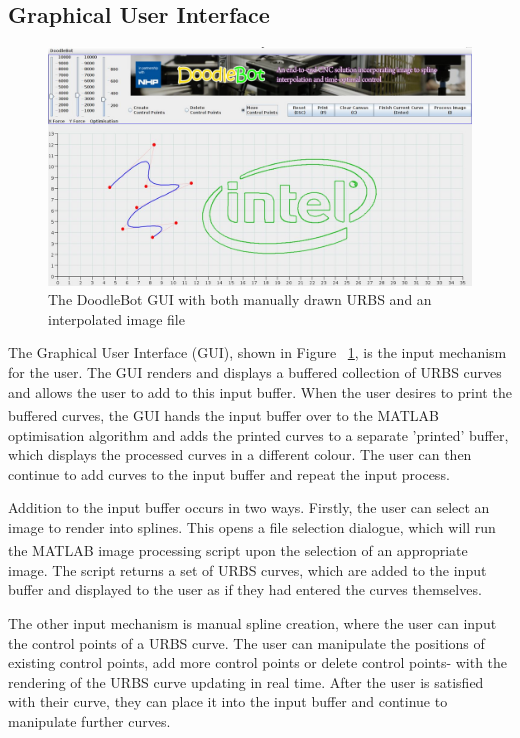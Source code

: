 \subsection{Graphical User Interface}

\begin{figure}[h]
	\centering
	\includegraphics[width=\textwidth]{figures/implementation/interface.jpg}
	\caption[The DoodleBot GUI]{The DoodleBot GUI with both manually drawn URBS and an interpolated image file}
	\label{fig:guiscreen}
\end{figure}

The Graphical User Interface (GUI), shown in Figure ~\ref{fig:guiscreen}, is the input mechanism for the user. The GUI renders and displays a buffered collection of URBS curves and allows the user to add to this input buffer. When the user desires to print the buffered curves, the GUI hands the input buffer over to the MATLAB\textsuperscript{\textregistered} optimisation algorithm and adds the printed curves to a separate 'printed' buffer, which displays the processed curves in a different colour. The user can then continue to add curves to the input buffer and repeat the input process.

Addition to the input buffer occurs in two ways. Firstly, the user can select an image to render into splines. This opens a file selection dialogue, which will run the MATLAB\textsuperscript{\textregistered} image processing script upon the selection of an appropriate image. The script returns a set of URBS curves, which are added to the input buffer and displayed to the user as if they had entered the curves themselves.

The other input mechanism is manual spline creation, where the user can input the control points of a URBS curve. The user can manipulate the positions of existing control points, add more control points or delete control points- with the rendering of the URBS curve updating in real time. After the user is satisfied with their curve, they can place it into the input buffer and continue to manipulate further curves.

